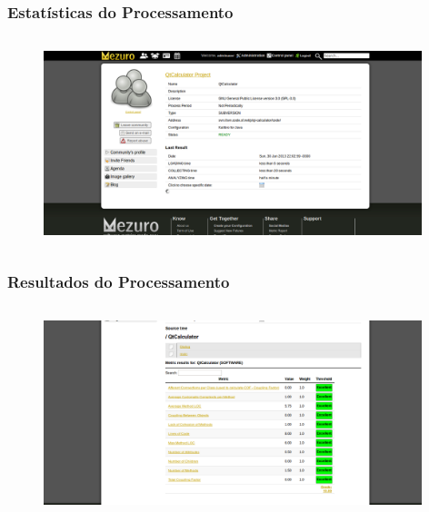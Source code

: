\documentclass{beamer}
\begin{document}
    \begin{frame}
      \frametitle{Estatísticas do Processamento}
      \framesubtitle{}

      \begin{figure}
        \begin{center}
          \includegraphics[width=11cm, height=6cm]{images/08-processing-stats.png}
          \label{fig:processing-stats}
        \end{center}
      \end{figure}
    \end{frame}

    \begin{frame}
      \frametitle{Resultados do Processamento}
      \framesubtitle{}

      \begin{figure}
        \begin{center}
          \includegraphics[width=11cm, height=6cm]{images/09-processing-results.png}
          \label{fig:processing-results}
        \end{center}
      \end{figure}
    \end{frame}
\end{document}
